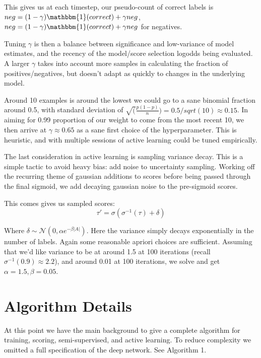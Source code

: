 \documentclass{article}
\begin{document}
This gives us at each timestep, our pseudo-count of correct labels is $neg=(1-\gamma)\mathbbm{1}(correct)+\gamma neg$, $neg=(1-\gamma)\mathbbm{1}(correct)+\gamma neg$ for negatives.  

Tuning $\gamma$ is then a balance between significance and low-variance of model estimates, and the recency of the model/score selection logodds being evaluated.  A larger $\gamma$ takes into account more samples in calculating the fraction of positives/negatives, but doesn't adapt as quickly to changes in the underlying model.  

Around 10 examples is around the lowest we could go to a sane binomial fraction around 0.5, with standard deviation of $\sqrt(\frac{p(1-p)}{n}) = 0.5/sqrt(10) \approx 0.15$.  In aiming for 0.99 proportion of our weight to come from the most recent 10, we then arrive at $\gamma \approx 0.65$ as a sane first choice of the hyperparameter.  This is heuristic, and with multiple sessions of active learning could be tuned empirically.  

The last consideration in active learning is sampling variance decay.  This is a simple tactic to avoid heavy bias: add noise to uncertainty sampling.  Working off the recurring theme of gaussian additions to scores before being passed through the final sigmoid, we add decaying gaussian noise to the pre-sigmoid scores.  

This comes gives us sampled scores:
$$\tau' = \sigma(\sigma^{-1}(\tau)+\delta)$$

Where $\delta \sim  \mathcal{N}(0,\alpha e^{-\beta | A | })$.  Here the variance simply decays exponentially in the number of labels.  Again some reasonable apriori choices are sufficient.  Assuming that we'd like variance to be at around 1.5 at 100 iterations (recall $\sigma^{-1}(0.9) \approx 2.2$), and around 0.01 at 100 iterations, we solve and get $\alpha=1.5, \beta=0.05$. 

\section{Algorithm Details}
At this point we have the main background to give a complete algorithm for training, scoring, semi-supervised, and active learning.  To reduce complexity we omitted a full specification of the deep network.  See Algorithm 1.
\end{document}

